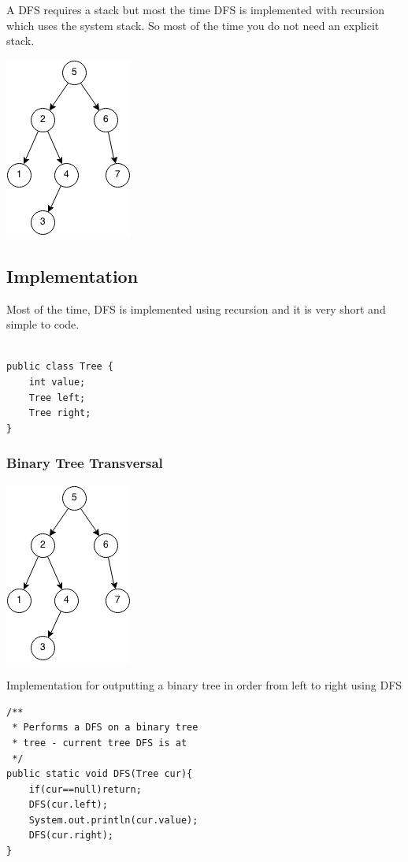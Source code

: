\documentclass[11pt,oneside]{book}
\makeatletter
\def\maxwidth#1{\ifdim\Gin@nat@width>#1 #1\else\Gin@nat@width\fi}
\makeatother
\begin{document}
A DFS requires a stack but most the time DFS is implemented with recursion which uses the system stack. So most of the time you do not need an explicit stack.

\includegraphics[width=\maxwidth{\textwidth}]{dfs.png}

\subsection{Implementation}

Most of the time, DFS is implemented using recursion and it is very short and simple to code.

\begin{lstlisting}

public class Tree {
    int value;
    Tree left;
    Tree right;
}
\end{lstlisting}

\subsubsection{Binary Tree Transversal}

\includegraphics[width=\maxwidth{\textwidth}]{dfs.png}

Implementation for outputting a binary tree in order from left to right using DFS

\begin{lstlisting}
/**
 * Performs a DFS on a binary tree
 * tree - current tree DFS is at
 */
public static void DFS(Tree cur){
    if(cur==null)return;
    DFS(cur.left);
    System.out.println(cur.value);
    DFS(cur.right);
}
\end{lstlisting}
\end{document}
